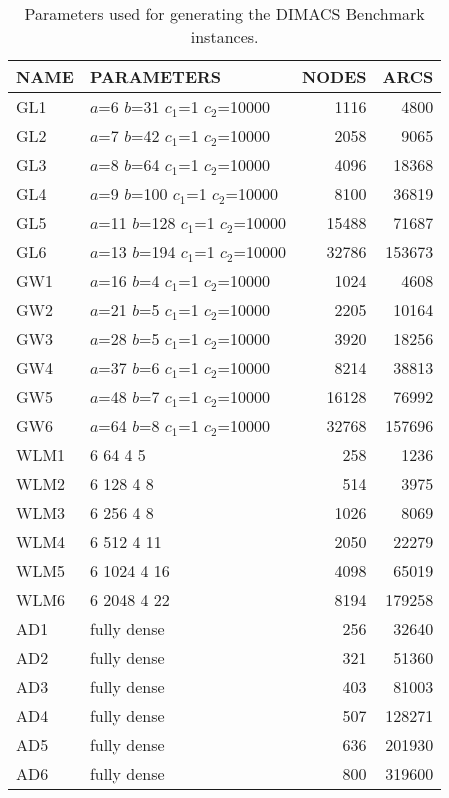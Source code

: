 \begin{itemize}
\begin{table}[h]\begin{center}
\caption{ Parameters used for generating the DIMACS Benchmark
instances.\label{Benchdef.tbl}} 
\begin{tabular}{||l|l|r|r||}
\hline
NAME &PARAMETERS&NODES&ARCS\\
\hline
GL1 & $a$=6 $b$=31 $c_1$=1 $c_2$=10000 & 1116 &  4800 \\
GL2 & $a$=7 $b$=42 $c_1$=1 $c_2$=10000 & 2058 &  9065 \\
GL3 & $a$=8 $b$=64 $c_1$=1 $c_2$=10000 & 4096 &  18368 \\
GL4 & $a$=9 $b$=100 $c_1$=1 $c_2$=10000 & 8100 &  36819 \\
GL5 & $a$=11 $b$=128 $c_1$=1 $c_2$=10000 & 15488 &  71687 \\
GL6 & $a$=13 $b$=194 $c_1$=1 $c_2$=10000 & 32786 &  153673 \\
\hline
GW1 & $a$=16 $b$=4 $c_1$=1 $c_2$=10000 & 1024 &  4608 \\
GW2 & $a$=21 $b$=5 $c_1$=1 $c_2$=10000 & 2205 &  10164 \\
GW3 & $a$=28 $b$=5 $c_1$=1 $c_2$=10000 & 3920 &  18256 \\
GW4 & $a$=37 $b$=6 $c_1$=1 $c_2$=10000 & 8214 &  38813 \\
GW5 & $a$=48 $b$=7 $c_1$=1 $c_2$=10000 & 16128 &  76992 \\
GW6 & $a$=64 $b$=8 $c_1$=1 $c_2$=10000 & 32768 &  157696 \\
\hline
WLM1 & 6 64 4 5 & 258 &  1236 \\
WLM2 & 6 128 4 8 & 514 &  3975 \\
WLM3 & 6 256 4 8 & 1026 & 8069 \\
WLM4 & 6 512 4 11 & 2050 &  22279 \\
WLM5 & 6 1024 4 16 & 4098 &  65019 \\
WLM6 & 6 2048 4 22 & 8194 &  179258 \\
\hline
AD1 & fully dense & 256 &  32640 \\
AD2 & fully dense & 321 &  51360 \\
AD3 & fully dense & 403 &  81003 \\
AD4 & fully dense & 507 &  128271 \\
AD5 & fully dense & 636 &  201930 \\
AD6 & fully dense & 800 &  319600 \\
\hline
\end{tabular}\end{center}
\end{table}
\clearpage


\end{itemize}

